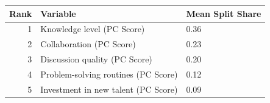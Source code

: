 
\begin{tabular}{rll}
\toprule
Rank & Variable & Mean Split Share\\
\midrule
1 & Knowledge level (PC Score) & 0.36\\
2 & Collaboration (PC Score) & 0.23\\
3 & Discussion quality (PC Score) & 0.20\\
4 & Problem-solving routines (PC Score) & 0.12\\
5 & Investment in new talent (PC Score) & 0.09\\
\bottomrule
\end{tabular}
